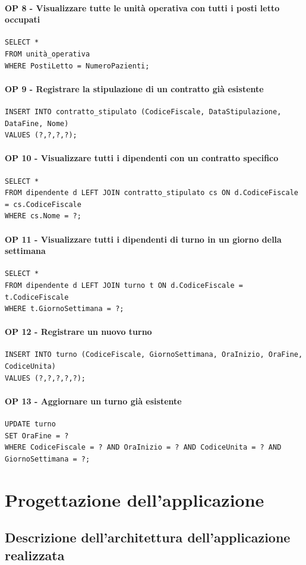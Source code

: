 \documentclass[a4paper, 12pt]{report}
\begin{document}
\subsubsection*{OP 8 - Visualizzare tutte le unità operativa con tutti i posti letto occupati}
\begin{lstlisting}[breaklines=true]
SELECT *
FROM unità_operativa
WHERE PostiLetto = NumeroPazienti;
\end{lstlisting}

\subsubsection*{OP 9 - Registrare la stipulazione di un contratto già esistente}
\begin{lstlisting}[breaklines=true]
INSERT INTO contratto_stipulato (CodiceFiscale, DataStipulazione, DataFine, Nome)
VALUES (?,?,?,?);
\end{lstlisting}

\subsubsection*{OP 10 - Visualizzare tutti i dipendenti con un contratto specifico}
\begin{lstlisting}[breaklines=true]
SELECT *
FROM dipendente d LEFT JOIN contratto_stipulato cs ON d.CodiceFiscale = cs.CodiceFiscale
WHERE cs.Nome = ?;
\end{lstlisting}

\subsubsection*{OP 11 - Visualizzare tutti i dipendenti di turno in un giorno della settimana}
\begin{lstlisting}[breaklines=true]
SELECT *
FROM dipendente d LEFT JOIN turno t ON d.CodiceFiscale = t.CodiceFiscale
WHERE t.GiornoSettimana = ?;
\end{lstlisting}

\subsubsection*{OP 12 - Registrare un nuovo turno}
\begin{lstlisting}[breaklines=true]
INSERT INTO turno (CodiceFiscale, GiornoSettimana, OraInizio, OraFine, CodiceUnita) 
VALUES (?,?,?,?,?);
\end{lstlisting}

\subsubsection*{OP 13 - Aggiornare un turno già esistente}
\begin{lstlisting}[breaklines=true]
UPDATE turno 
SET OraFine = ? 
WHERE CodiceFiscale = ? AND OraInizio = ? AND CodiceUnita = ? AND GiornoSettimana = ?;
\end{lstlisting}

\chapter{Progettazione dell’applicazione}

\section{Descrizione dell’architettura dell’applicazione realizzata}
\end{document}
